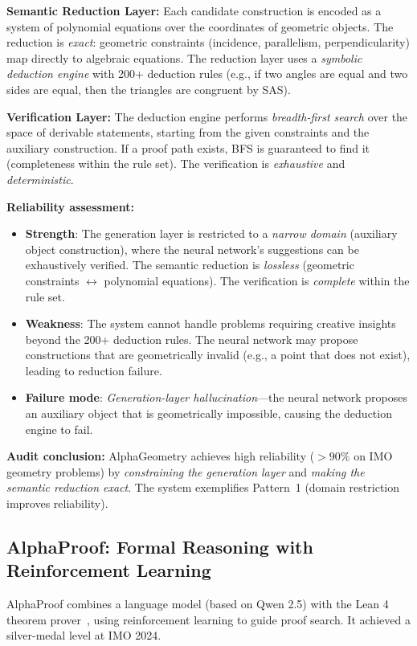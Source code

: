 \documentclass[11pt,a4paper]{article}
\begin{document}
\textbf{Semantic Reduction Layer:} Each candidate construction is encoded as a system of polynomial equations over the coordinates of geometric objects. The reduction is \emph{exact}: geometric constraints (incidence, parallelism, perpendicularity) map directly to algebraic equations. The reduction layer uses a \emph{symbolic deduction engine} with 200+ deduction rules (e.g., if two angles are equal and two sides are equal, then the triangles are congruent by SAS).

\textbf{Verification Layer:} The deduction engine performs \emph{breadth-first search} over the space of derivable statements, starting from the given constraints and the auxiliary construction. If a proof path exists, BFS is guaranteed to find it (completeness within the rule set). The verification is \emph{exhaustive} and \emph{deterministic}.

\textbf{Reliability assessment:}
\begin{itemize}
  \item \textbf{Strength}: The generation layer is restricted to a \emph{narrow domain} (auxiliary object construction), where the neural network's suggestions can be exhaustively verified. The semantic reduction is \emph{lossless} (geometric constraints $\leftrightarrow$ polynomial equations). The verification is \emph{complete} within the rule set.
  \item \textbf{Weakness}: The system cannot handle problems requiring creative insights beyond the 200+ deduction rules. The neural network may propose constructions that are geometrically invalid (e.g., a point that does not exist), leading to reduction failure.
  \item \textbf{Failure mode}: \emph{Generation-layer hallucination}---the neural network proposes an auxiliary object that is geometrically impossible, causing the deduction engine to fail.
\end{itemize}

\textbf{Audit conclusion:} AlphaGeometry achieves high reliability ($>90\%$ on IMO geometry problems) by \emph{constraining the generation layer} and \emph{making the semantic reduction exact}. The system exemplifies Pattern~1 (domain restriction improves reliability).

\subsection{AlphaProof: Formal Reasoning with Reinforcement Learning}

AlphaProof combines a language model (based on Qwen 2.5) with the Lean 4 theorem prover~\cite{avigad2014lean}, using reinforcement learning to guide proof search. It achieved a silver-medal level at IMO 2024.
\end{document}
